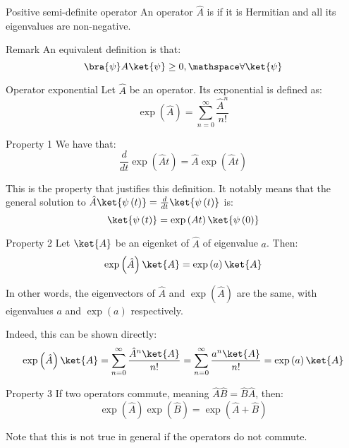 \documentclass[a4paper]{article}
\begin{document}
\begin{parag}{Positive semi-definite operator}
    An operator $\hat{A}$ is  if it is Hermitian and all its eigenvalues are non-negative.

    \begin{subparag}{Remark}
        An equivalent definition is that:
        \[\bra{\psi} A \ket{\psi} \geq 0, \mathspace \forall \ket{\psi}\]
    \end{subparag}
\end{parag}

\begin{parag}{Operator exponential}
    Let $\hat{A}$ be an operator. Its exponential is defined as: 
    \[\exp\left(\hat{A}\right) = \sum_{n=0}^{\infty} \frac{\hat{A}^n}{n!}\]
    
    \begin{subparag}{Property 1}
        We have that: 
        \[\frac{d}{dt} \exp\left(\hat{A} t\right) = \hat{A} \exp\left(\hat{A} t\right)\]

        This is the property that justifies this definition. It notably means that the general solution to $\hat{A} \ket{\psi\left(t\right)} = \frac{d}{dt} \ket{\psi\left(t\right)}$ is: 
        \[\ket{\psi\left(t\right)} = \exp\left(At\right) \ket{\psi\left(0\right)}\]
    \end{subparag}

    \begin{subparag}{Property 2}
        Let $\ket{A}$ be an eigenket of $\hat{A}$ of eigenvalue $a$. Then: 
        \[\exp\left(\hat{A}\right)\ket{A} = \exp\left(a\right) \ket{A}\]

        In other words, the eigenvectors of $\hat{A}$ and $\exp\left(\hat{A}\right)$ are the same, with eigenvalues $a$ and $\exp\left(a\right)$ respectively.

        Indeed, this can be shown directly: 
        \[\exp\left(\hat{A}\right) \ket{A} = \sum_{n=0}^{\infty} \frac{\hat{A}^n \ket{A}}{n!} = \sum_{n=0}^{\infty} \frac{a^n \ket{A}}{n!} = \exp\left(a\right) \ket{A}\]
    \end{subparag}

    \begin{subparag}{Property 3}
        If two operators commute, meaning $\hat{A} \hat{B} = \hat{B}\hat{A}$, then: 
        \[\exp\left(\hat{A}\right) \exp\left(\hat{B}\right) = \exp\left(\hat{A} + \hat{B}\right)\]
        
        Note that this is not true in general if the operators do not commute.
    \end{subparag}
\end{parag}
\end{document}
